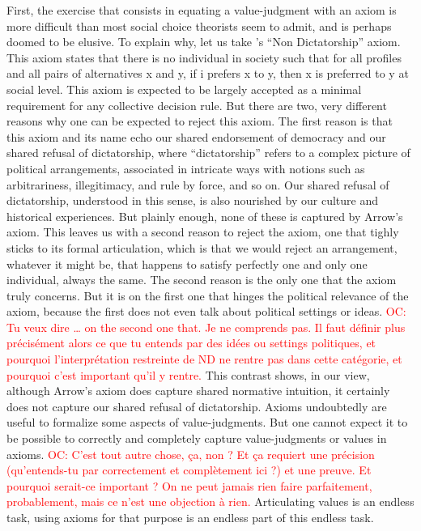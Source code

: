 \documentclass[preprint,11pt]{elsarticle}
\newcommand{\commentOC}[1]{\textcolor{red}{OC: #1}}
\begin{document}
First, the exercise that consists in equating a value-judgment with an axiom is more difficult than most social choice theorists seem to admit, and is perhaps doomed to be elusive. To explain why, let us take \cite{arrow_social_2012}'s “Non Dictatorship” axiom. This axiom states that there is no individual  in society such that for all profiles and all pairs of alternatives x and y, if i prefers x to y, then x is preferred to y at social level. This axiom is expected to be largely accepted as a minimal requirement for any collective decision rule. But there are two, very different reasons why one can be expected to reject this axiom. The first reason is that this axiom and its name echo our shared endorsement of democracy and our shared refusal of dictatorship, where ``dictatorship'' refers to a complex picture of political arrangements, associated in intricate ways with notions such as arbitrariness, illegitimacy, and rule by force, and so on. Our shared refusal of dictatorship, understood in this sense, is also nourished by our culture and historical experiences. But plainly enough, none of these is captured by Arrow's axiom. This leaves us with a second reason to reject the axiom, one that tighly sticks to its formal articulation, which is that we would reject an arrangement, whatever it might be, that happens to satisfy perfectly one and only one individual, always the same. The second reason is the only one that the axiom truly concerns. But it is on the first one that hinges the political relevance of the axiom, because the first does not even talk about political settings or ideas. \commentOC{Tu veux dire … on the second one that. Je ne comprends pas. Il faut définir plus précisément alors ce que tu entends par des idées ou settings politiques, et pourquoi l’interprétation restreinte de ND ne rentre pas dans cette catégorie, et pourquoi c’est important qu’il y rentre.} This contrast shows, in our view, although Arrow's axiom does capture shared normative intuition, it certainly does not capture our shared refusal of dictatorship. Axioms undoubtedly are useful to formalize some aspects of value-judgments. But one cannot expect it to be possible to correctly and completely capture value-judgments or values in axioms. \commentOC{C’est tout autre chose, ça, non ? Et ça requiert une précision (qu’entends-tu par correctement et complètement ici ?) et une preuve. Et pourquoi serait-ce important ? On ne peut jamais rien faire parfaitement, probablement, mais ce n’est une objection à rien.} Articulating values is an endless task, using axioms for that purpose is an endless part of this endless task.
\end{document}
